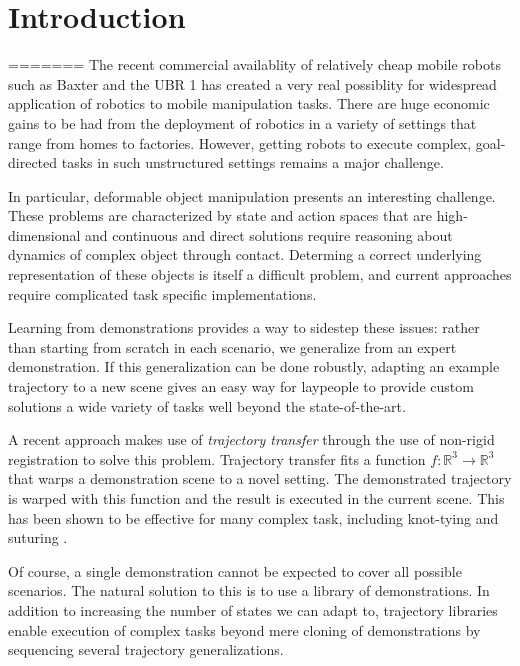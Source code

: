 \section{Introduction}




=======
The recent commercial availablity of relatively cheap mobile robots such as
Baxter and the UBR 1 has created a very real possiblity for widespread
application of robotics to mobile manipulation tasks.  There are huge economic
gains to be had from the deployment of robotics in a variety of settings that
range from homes to factories.  However, getting robots to execute complex,
goal-directed tasks in such unstructured settings remains a major challenge.

In particular, deformable object manipulation presents an interesting challenge.
These problems are characterized by state and action spaces that are high-dimensional 
and continuous and direct solutions require reasoning about dynamics of complex object 
through contact.
Determing a correct underlying representation of these objects is itself a difficult problem,
and current approaches require complicated task specific implementations.

Learning from demonstrations provides a way to sidestep these issues: rather
than starting from scratch in each scenario, we generalize from an expert
demonstration.  If this generalization can be done robustly, adapting an example
trajectory to a new scene gives an easy way for laypeople to provide custom
solutions a wide variety of tasks well beyond the state-of-the-art.

A recent approach makes use of \emph{trajectory transfer} through the use of
non-rigid registration to solve this problem.  Trajectory transfer fits a
function $f:\mathbb{R}^3 \rightarrow \mathbb{R}^3$ that warps a demonstration
scene to a novel setting.  The demonstrated trajectory is warped with this
function and the result is executed in the current scene.  This has been shown
to be effective for many complex task, including knot-tying and suturing
\cite{Schulmanetal_ISRR2013, Schulmanetal_IROS2013}.

Of course, a single demonstration cannot be expected to cover all possible scenarios.
The natural solution to this is to use a library of demonstrations.
In addition to increasing the number of states we can adapt to, trajectory libraries
enable execution of complex tasks beyond mere cloning of demonstrations by sequencing 
several trajectory generalizations.

